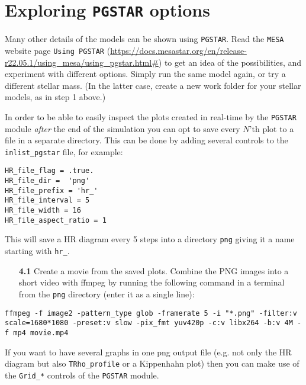 \documentclass[11pt,a4paper]{article}
\begin{document}
\section{Exploring \texttt{PGSTAR} options} 

Many other details of the models can be shown using \texttt{PGSTAR}. Read the \texttt{MESA} website page \texttt{Using PGSTAR} (\url{https://docs.mesastar.org/en/release-r22.05.1/using_mesa/using_pgstar.html#}) to get an idea of the possibilities, and experiment with different options. Simply run the same model again, or try a different stellar mass. (In the latter case, create a new work folder for your stellar models, as in step 1 above.)

 In order to be able to easily inspect the plots created in
real-time by the \texttt{PGSTAR} module \emph{after} the end of the simulation you can
opt to save every $N$'th plot to a file in a separate directory. This can
be done by adding several controls to the \verb|inlist_pgstar| file, for
example:
\begin{lstlisting}
HR_file_flag = .true.
HR_file_dir =  'png'
HR_file_prefix = 'hr_'
HR_file_interval = 5
HR_file_width = 16
HR_file_aspect_ratio = 1
\end{lstlisting}

This will save a HR diagram every 5 steps into a directory \verb'png' giving
it a name starting with \verb"hr_".


\begin{enumerate}
  \item[\bf{4.1}] 
 Create a movie from the saved plots. Combine the PNG images into a short video with ffmpeg by running the following command in a terminal from the \verb'png' directory (enter it as a single line):
\end{enumerate}

\begin{lstlisting}
ffmpeg -f image2 -pattern_type glob -framerate 5 -i "*.png" -filter:v scale=1680*1080 -preset:v slow -pix_fmt yuv420p -c:v libx264 -b:v 4M -f mp4 movie.mp4
\end{lstlisting}



\begin{tcolorbox}[protipbox]
If you want to have several graphs in one png output file (e.g. not only the HR diagram but also \verb|TRho_profile| or a Kippenhahn plot) then you can make use of the \verb|Grid_*| controls of the \texttt{PGSTAR} module.
\end{tcolorbox}





\end{document}
